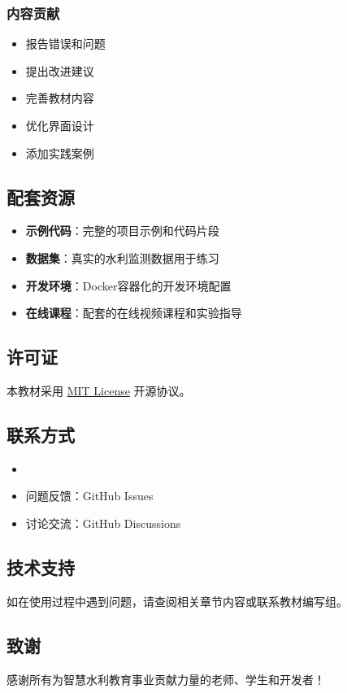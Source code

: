 \subsubsection{内容贡献}\label{ux5185ux5bb9ux8d21ux732e} \begin{itemize} \tightlist \item 报告错误和问题 \item 提出改进建议 \item 
完善教材内容 \item 优化界面设计 \item 添加实践案例 \end{itemize} \subsection{配套资源}\label{ux914dux5957ux8d44ux6e90} \begin{itemize}
\tightlist \item \textbf{示例代码}：完整的项目示例和代码片段 \item \textbf{数据集}：真实的水利监测数据用于练习 \item \textbf{开发环境}：Docker容器化的开发环境配置 \item
\textbf{在线课程}：配套的在线视频课程和实验指导 \end{itemize} \subsection{许可证}\label{ux8bb8ux53efux8bc1} 本教材采用 \href{LICENSE}{MIT License}
开源协议。 \subsection{联系方式}\label{ux8054ux7cfbux65b9ux5f0f} \begin{itemize} \tightlist \item \item 问题反馈：GitHub Issues \item
讨论交流：GitHub Discussions \end{itemize} \subsection{技术支持}\label{ux6280ux672fux652fux6301}
如在使用过程中遇到问题，请查阅相关章节内容或联系教材编写组。 \subsection{致谢}\label{ux81f4ux8c22} 感谢所有为智慧水利教育事业贡献力量的老师、学生和开发者！
